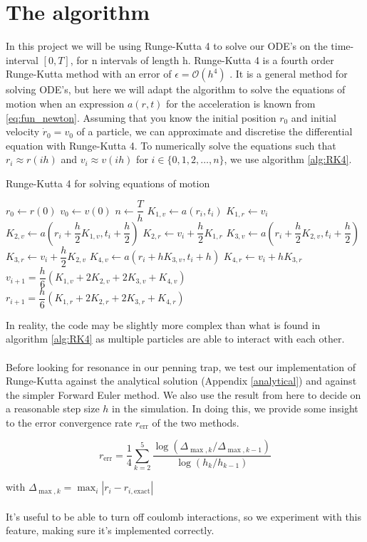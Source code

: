 \section*{The algorithm}
In this project we will be using Runge-Kutta 4 to solve our ODE's on the time-interval $[0, T]$, for n intervals of length h. Runge-Kutta 4 is a fourth order Runge-Kutta method with an error of $\epsilon = \mathcal{O}(h^4)$ . It is a general method for solving ODE's, but here we will adapt the algorithm to solve the equations of motion when an expression $a(r, t)$ for the acceleration is known from \ref{eq:fun_newton}. Assuming that you know the initial position $r_0$ and initial velocity $\dot{r}_0=v_0$ of a particle, we can approximate and discretise the differential equation with Runge-Kutta 4. To numerically solve the equations such that $r_i \approx r(ih)$ and $v_i \approx v(ih)$ for $i \in \{0, 1, 2, \ldots, n\}$, we use algorithm \ref{alg:RK4}.

\begin{algorithm}
\caption{Runge-Kutta 4 for solving equations of motion}\label{alg:RK4} %
\begin{algorithmic}[1]
\State $r_0 \gets r(0)$
	\State $v_0 \gets v(0)$
	\State $n \gets \dfrac{T}{h}$
        \State $K_{1,v} \gets a(r_i, t_i)$
		\State $K_{1,r} \gets v_i$
		\State $K_{2,v} \gets a(r_i + \dfrac{h}{2}K_{1,v}, t_i + \dfrac{h}{2})$
		\State $K_{2,r} \gets v_i + \dfrac{h}{2} K_{1,r}$
		\State $K_{3,v} \gets a(r_i + \dfrac{h}{2}K_{2,v}, t_i + \dfrac{h}{2})$
		\State $K_{3,r} \gets v_i + \dfrac{h}{2} K_{2,v}$
		\State $K_{4, v} \gets a(r_i + hK_{3,v}, t_i+h)$
		\State $K_{4, r} \gets v_i + hK_{3,r}$
		\State $v_{i+1} = \dfrac{h}{6}(K_{1,v} + 2K_{2,v} + 2K_{3,v} + K_{4,v})$
		\State $r_{i+1} = \dfrac{h}{6}(K_{1,r} + 2K_{2,r} + 2K_{3,r} + K_{4,r})$
	\EndFor
\end{algorithmic}
\end{algorithm}

	

In reality, the code may be slightly more complex than what is found in algorithm \ref{alg:RK4} as multiple particles are able to interact with each other.
\\ \\
Before looking for resonance in our penning trap, we test our implementation of Runge-Kutta against the analytical solution (Appendix \ref{analytical}) and against the simpler Forward Euler method. We also use the result from here to decide on a reasonable step size $h$ in the simulation. In doing this, we provide some insight to the error convergence rate $r_\text{err}$ of the two methods.

$$
r_\text{err} = \frac{1}{4} \sum_{k = 2}^5 \frac{\log(\Delta_{\max, k}/\Delta_{\max, k-1})}{\log(h_k / h_{k-1})}
$$

with $\Delta_{\max, k} = \max_i |r_i - r_{i, \text{exact}}|$
\\\\
It's useful to be able to turn off coulomb interactions, so we experiment with this feature, making sure it's implemented correctly.
